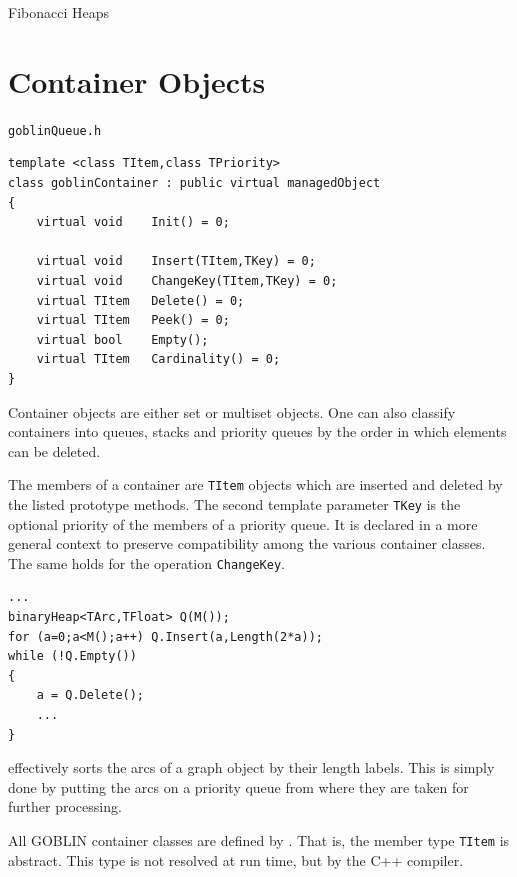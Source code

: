 \documentclass[a4paper,11pt,twoside]{book}
\begin{document}
\begin{multicols}{2}
\bigskip
\begin{figurehere}
\begin{center}
\epsfxsize=12cm
\vspace{0.5cm}
\caption{\label{flb_fibheap}Fibonacci Heaps}
\end{center}
\end{figurehere}


\section{Container Objects}
\myinclude\verb/goblinQueue.h/
\begin{mymethods}
\begin{verbatim}
template <class TItem,class TPriority>
class goblinContainer : public virtual managedObject
{
    virtual void    Init() = 0;

    virtual void    Insert(TItem,TKey) = 0;
    virtual void    ChangeKey(TItem,TKey) = 0;
    virtual TItem   Delete() = 0;
    virtual TItem   Peek() = 0;
    virtual bool    Empty();
    virtual TItem   Cardinality() = 0;
}
\end{verbatim}
\end{mymethods}
Container objects are either set or multiset objects. One can also classify
containers into queues, stacks and priority queues by the order in which
elements can be deleted.

The members of a container are \verb/TItem/ objects which are
inserted and deleted by the listed prototype methods.
The second template parameter \verb/TKey/ is the optional priority
of the members of a priority queue. It is declared in a more general context
to preserve compatibility among the various container classes. The same holds
for the operation \verb/ChangeKey/.
\begin{mysample}
\begin{verbatim}
...
binaryHeap<TArc,TFloat> Q(M());
for (a=0;a<M();a++) Q.Insert(a,Length(2*a));
while (!Q.Empty())
{
    a = Q.Delete();
    ...
}
\end{verbatim}
\end{mysample}
effectively sorts the arcs of a graph object by their length labels. This is
simply done by putting the arcs on a priority queue from where they are taken
for further processing.

All GOBLIN container classes are defined by . That is, the member
type \verb/TItem/ is abstract. This type is not resolved at run time, but by
the C++ compiler.


\end{multicols}
\end{document}
